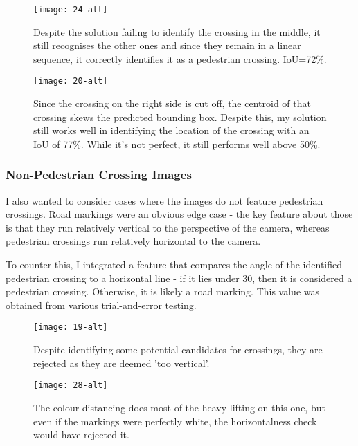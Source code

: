 \documentclass{article}  %
\begin{document}
	\begin{figure}[H]
		\begin{minipage}[c]{0.45\linewidth}
			\centering
			\texttt{[image: 24-alt]}
			\caption{Despite the solution failing to identify the crossing in the middle, it still recognises the other ones and since they remain in a linear sequence, it correctly identifies it as a pedestrian crossing. IoU=72\%.}
			\label{missing-middle}
		\end{minipage}\hfill
		\begin{minipage}[c]{0.45\linewidth}
			\centering
			\texttt{[image: 20-alt]}
			\caption{Since the crossing on the right side is cut off, the centroid of that crossing skews the predicted bounding box. Despite this, my solution still works well in identifying the location of the crossing with an IoU of 77\%. While it's not perfect, it still performs well above 50\%.}
			\label{outlier-image}
		\end{minipage}
	\end{figure}
	
	\subsubsection{Non-Pedestrian Crossing Images}
	
	I also wanted to consider cases where the images do not feature pedestrian crossings. Road markings were an obvious edge case - the key feature about those is that they run relatively vertical to the perspective of the camera, whereas pedestrian crossings run relatively horizontal to the camera.
	
	To counter this, I integrated a feature that compares the angle of the identified pedestrian crossing to a horizontal line - if it lies under 30\textdegree , then it is considered a pedestrian crossing. Otherwise, it is likely a road marking. This value was obtained from various trial-and-error testing.
	
	\begin{figure}[H]
		\begin{minipage}[c]{0.45\linewidth}
			\centering
			\texttt{[image: 19-alt]}
			\caption{Despite identifying some potential candidates for crossings, they are rejected as they are deemed 'too vertical'.}
		\end{minipage}\hfill
		\begin{minipage}[c]{0.45\linewidth}
		\centering
		\texttt{[image: 28-alt]}
		\caption{The colour distancing does most of the heavy lifting on this one, but even if the markings were perfectly white, the horizontalness check would have rejected it.}
		\end{minipage}
	\end{figure}
	
\end{document}

